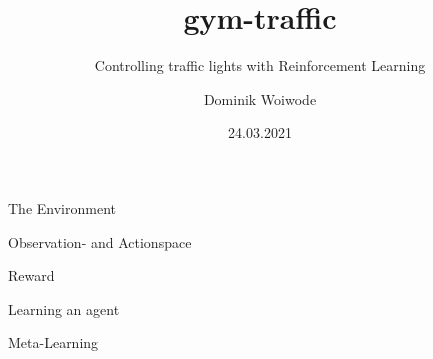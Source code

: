 \documentclass[aspectratio=43,t,xcolor={usenames,dvipsnames}]{beamer}
\title{gym-traffic}
\subtitle{Controlling traffic lights with Reinforcement Learning}
\author{Dominik Woiwode}
\date{24.03.2021}
\begin{document}
    \maketitle
    \begin{frame}[c]{The Environment}

    \end{frame}


    \begin{frame}[c]{Observation- and Actionspace}

    \end{frame}


    \begin{frame}[c]{Reward}

    \end{frame}


    \begin{frame}[c]{Learning an agent}

    \end{frame}


    \begin{frame}[c]{Meta-Learning}

    \end{frame}
\end{document}
